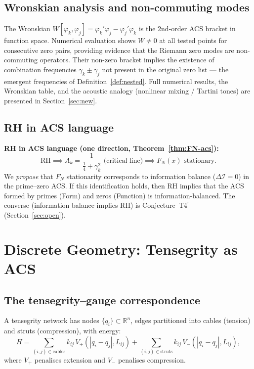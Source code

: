 \documentclass[12pt,a4paper]{article}
\theoremstyle{plain}
\theoremstyle{definition}
\theoremstyle{remark}
\newcommand{\DI}{\Delta\mathcal{I}}
\begin{document}
\subsection{Wronskian analysis and non-commuting modes}

The Wronskian $W[\varphi_k, \varphi_j] = \varphi_k'\varphi_j - \varphi_j'\varphi_k$
is the 2nd-order ACS bracket in function space.  Numerical evaluation
shows $W \neq 0$ at all tested points for consecutive zero pairs,
providing evidence that the Riemann zero modes are non-commuting
operators.  Their non-zero bracket implies the existence of
combination frequencies $\gamma_k \pm \gamma_j$ not present in the
original zero list --- the emergent frequencies of
Definition~\ref{def:nested}.  Full numerical results, the Wronskian
table, and the acoustic analogy (nonlinear mixing / Tartini tones)
are presented in Section~\ref{sec:new}.

\subsection{RH in ACS language}

\textbf{RH in ACS language (one direction, Theorem~\ref{thm:FN-acs}):}
\begin{equation}
  \mathrm{RH} \implies A_k = \frac{1}{\tfrac{1}{4}+\gamma_k^2} \text{ (critical line)}
             \implies F_N(x) \text{ stationary.}
\end{equation}
We \emph{propose} that $F_N$ stationarity corresponds to information balance 
($\DI = 0$) in the prime--zero ACS.  If this identification holds, then 
RH implies that the ACS formed by primes (Form) and zeros (Function) 
is information-balanced.  The converse (information balance implies RH) 
is Conjecture~T4$^\prime$ (Section~\ref{sec:open}).

\section{Discrete Geometry: Tensegrity as ACS}
\label{sec:tensegrity}

\subsection{The tensegrity--gauge correspondence}

A tensegrity network has nodes $\{q_i\} \subset \mathbb{R}^n$, edges 
partitioned into cables (tension) and struts (compression), with energy:
\begin{equation}
  H = \sum_{(i,j)\in\mathrm{cables}} k_{ij}\,V_+(|q_i-q_j|, L_{ij})
    + \sum_{(i,j)\in\mathrm{struts}} k_{ij}\,V_-(|q_i-q_j|, L_{ij}),
\end{equation}
where $V_+$ penalises extension and $V_-$ penalises compression.
\end{document}
